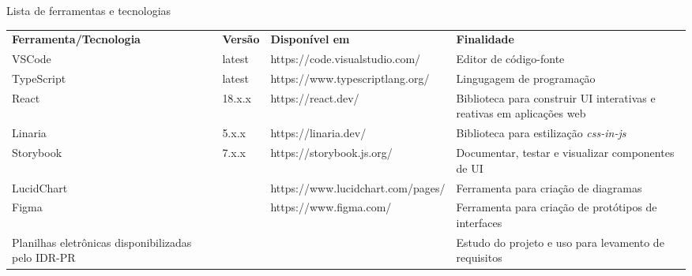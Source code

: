 \begin{tabframed}[htb]
  \caption{Lista de ferramentas e tecnologias}
  \label{quad:materiais}
  \renewcommand{\arraystretch}{2}
  \begin{tabular}{|l|l|l|l|}
    \cline{1-4}
    \textbf{Ferramenta/Tecnologia}    &
    \textbf{Versão}                   &
    \textbf{Disponível em}            &
    \textbf{Finalidade}
    \\ \cline{1-4}

    \gls{VSCode}                      &
    latest                            &
    https://code.visualstudio.com/    &
    Editor de código-fonte
    \\ \cline{1-4}

    TypeScript                        &
    latest                            &
    https://www.typescriptlang.org/   &
    Lingugagem de programação
    \\ \cline{1-4}

    React                             &
    18.x.x                            &
    https://react.dev/                &
    \multicolumn{1}{p{4cm}|}{\raggedright Biblioteca para construir \gls{UI} interativas e reativas em aplicações web}
    \\ \cline{1-4}

    Linaria                           &
    5.x.x                             &
    https://linaria.dev/              &
    \multicolumn{1}{p{4cm}|}{\raggedright Biblioteca para estilização \textit{css-in-js}}
    \\ \cline{1-4}

    Storybook                         &
    7.x.x                             &
    https://storybook.js.org/         &
    \multicolumn{1}{p{4cm}|}{\raggedright Documentar, testar e visualizar componentes de \gls{UI}}
    \\ \cline{1-4}

    LucidChart                        &
                                      &
    https://www.lucidchart.com/pages/ &
    \multicolumn{1}{p{4cm}|}{\raggedright Ferramenta para criação de diagramas}
    \\ \cline{1-4}

    Figma                             &
                                      &
    https://www.figma.com/            &
    \multicolumn{1}{p{4cm}|}{\raggedright Ferramenta para criação de protótipos de interfaces}
    \\ \cline{1-4}

    \multicolumn{1}{p{4cm}|}{\raggedright Planilhas eletrônicas disponibilizadas pelo \gls{IDR-PR}} 
                                      &
                                      &
                                      &
    \multicolumn{1}{p{4cm}|}{\raggedright Estudo do projeto e uso para levamento de requisitos}
    \\ \cline{1-4}
  \end{tabular}
  \fonte{}%
\end{tabframed}

